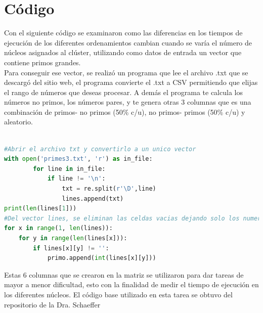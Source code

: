 \documentclass{article}
\begin{document}
\section{Código}
Con el siguiente código se examinaron como las diferencias en los tiempos de ejecución de los diferentes ordenamientos cambian cuando se varía el número de núcleos asignados al clúster, utilizando como datos de entrada un vector que contiene primos grandes.\\ 
Para conseguir ese vector, se realizó un programa que lee el archivo .txt que se descargó del sitio web\cite{Denisse_L}, el programa convierte el .txt a CSV permitiendo que elijas el rango de números que deseas procesar. A demás el programa te calcula los números no primos, los números pares, y te genera otras 3 columnas que es una combinación de primos- no primos (50\% c/u), no primos- primos (50\% c/u) y aleatorio.\\
\newpage
{}

\lstset{style=mystyle}
\begin{lstlisting}[language=Python, caption= Código para convertir de txt a CSV]

#Abrir el archivo txt y convertirlo a un unico vector
with open('primes3.txt', 'r') as in_file:
        for line in in_file:
            if line != '\n':
                txt = re.split(r'\D',line)
                lines.append(txt)
print(len(lines[1]))
#Del vector lines, se eliminan las celdas vacias dejando solo los numeros primos
for x in range(1, len(lines)):
    for y in range(len(lines[x])):
        if lines[x][y] != '':
            primo.append(int(lines[x][y]))

\end{lstlisting}

Estas 6 columnas que se crearon en la matriz se utilizaron para dar tareas de mayor a menor dificultad, esto con la finalidad de medir el tiempo de ejecución en los diferentes núcleos. El código base utilizado en esta tarea se obtuvo del repositorio de la Dra. Schaeffer \cite{Elisa_Schaeffer}
\end{document}

